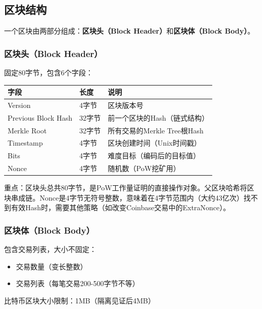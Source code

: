 ﻿\documentclass[12pt,a4paper]{article}
\begin{document}
\subsection{区块结构}

一个区块由两部分组成：\textbf{区块头（Block Header）}和\textbf{区块体（Block Body）}。

\subsubsection{区块头（Block Header）}

固定80字节，包含6个字段：

\begin{center}
\begin{tabular}{|l|l|l|}
\hline
\rowcolor{LightBG}
\textbf{字段} & \textbf{长度} & \textbf{说明} \\
\hline
Version & 4字节 & 区块版本号 \\
\hline
Previous Block Hash & 32字节 & 前一个区块的Hash（链式结构） \\
\hline
Merkle Root & 32字节 & 所有交易的Merkle Tree根Hash \\
\hline
Timestamp & 4字节 & 区块创建时间（Unix时间戳） \\
\hline
Bits & 4字节 & 难度目标（编码后的目标值） \\
\hline
Nonce & 4字节 & 随机数（PoW挖矿用） \\
\hline
\end{tabular}
\end{center}

\begin{keypointbox}
重点：区块头总共80字节，是PoW工作量证明的直接操作对象。父区块哈希将区块串成链。Nonce是4字节无符号整数，意味着在4字节范围内（大约43亿次）找不到有效Hash时，需要其他策略（如改变Coinbase交易中的ExtraNonce）。
\end{keypointbox}

\subsubsection{区块体（Block Body）}

包含交易列表，大小不固定：
\begin{itemize}[leftmargin=1.5em]
\item 交易数量（变长整数）
\item 交易列表（每笔交易200-500字节不等）
\end{itemize}

比特币区块大小限制：1MB（隔离见证后4MB）
\end{document}
